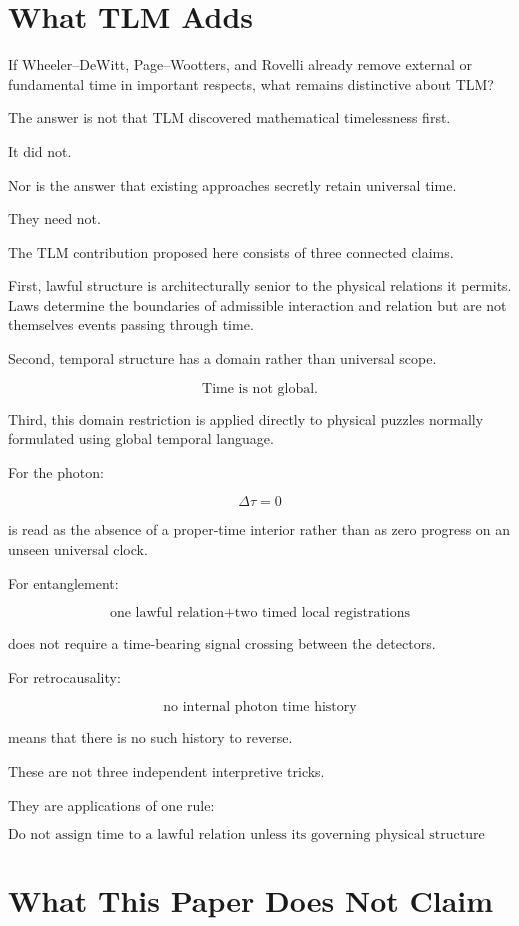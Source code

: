 \documentclass[12pt,onecolumn]{article}
\theoremstyle{plain}
\theoremstyle{definition}
\theoremstyle{remark}
\begin{document}
\section{What TLM Adds}

If Wheeler--DeWitt, Page--Wootters, and Rovelli already remove external or
fundamental time in important respects, what remains distinctive about TLM?

The answer is not that TLM discovered mathematical timelessness first.

It did not.

Nor is the answer that existing approaches secretly retain universal time.

They need not.

The TLM contribution proposed here consists of three connected claims.

First, lawful structure is architecturally senior to the physical relations
it permits. Laws determine the boundaries of admissible interaction and
relation but are not themselves events passing through time.

Second, temporal structure has a domain rather than universal scope.

\[
\boxed{
\text{Time is not global.}
}
\]

Third, this domain restriction is applied directly to physical puzzles
normally formulated using global temporal language.

For the photon:

\[
\Delta\tau=0
\]

is read as the absence of a proper-time interior rather than as zero
progress on an unseen universal clock.

For entanglement:

\[
\text{one lawful relation}
+
\text{two timed local registrations}
\]

does not require a time-bearing signal crossing between the detectors.

For retrocausality:

\[
\text{no internal photon time history}
\]

means that there is no such history to reverse.

These are not three independent interpretive tricks.

They are applications of one rule:

\[
\boxed{
\text{Do not assign time to a lawful relation unless its governing
physical structure supplies time.}
}
\]


\section{What This Paper Does Not Claim}
\end{document}

